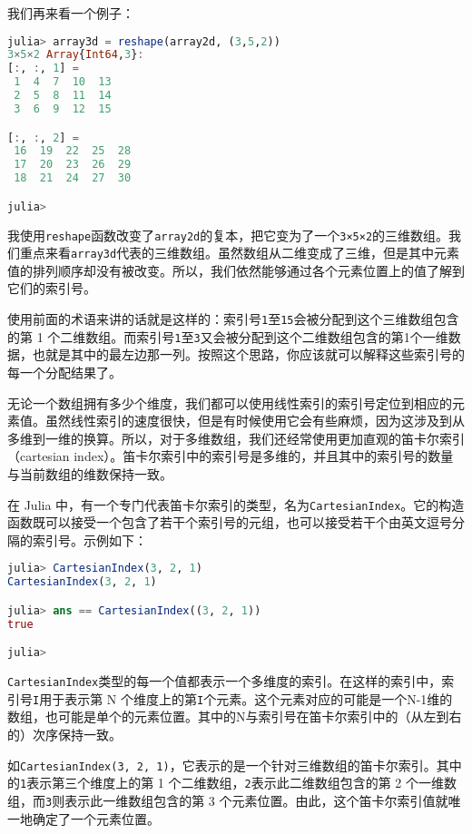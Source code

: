 我们再来看一个例子：

\begin{lstlisting}[language=julia]
julia> array3d = reshape(array2d, (3,5,2))
3×5×2 Array{Int64,3}:
[:, :, 1] =
 1  4  7  10  13
 2  5  8  11  14
 3  6  9  12  15

[:, :, 2] =
 16  19  22  25  28
 17  20  23  26  29
 18  21  24  27  30

julia> 
\end{lstlisting}

我使用\verb`reshape`函数改变了\verb`array2d`的复本，把它变为了一个\verb`3×5×2`的三维数组。我们重点来看\verb`array3d`代表的三维数组。虽然数组从二维变成了三维，但是其中元素值的排列顺序却没有被改变。所以，我们依然能够通过各个元素位置上的值了解到它们的索引号。

使用前面的术语来讲的话就是这样的：索引号\verb`1`至\verb`15`会被分配到这个三维数组包含的第 1 个二维数组。而索引号\verb`1`至\verb`3`又会被分配到这个二维数组包含的第1个一维数据，也就是其中的最左边那一列。按照这个思路，你应该就可以解释这些索引号的每一个分配结果了。

无论一个数组拥有多少个维度，我们都可以使用线性索引的索引号定位到相应的元素值。虽然线性索引的速度很快，但是有时候使用它会有些麻烦，因为这涉及到从多维到一维的换算。所以，对于多维数组，我们还经常使用更加直观的笛卡尔索引（cartesian index）。笛卡尔索引中的索引号是多维的，并且其中的索引号的数量与当前数组的维数保持一致。

在 Julia 中，有一个专门代表笛卡尔索引的类型，名为\verb`CartesianIndex`。它的构造函数既可以接受一个包含了若干个索引号的元组，也可以接受若干个由英文逗号分隔的索引号。示例如下：

\begin{lstlisting}[language=julia]
julia> CartesianIndex(3, 2, 1)
CartesianIndex(3, 2, 1)

julia> ans == CartesianIndex((3, 2, 1))
true

julia> 
\end{lstlisting}

\verb`CartesianIndex`类型的每一个值都表示一个多维度的索引。在这样的索引中，索引号\verb`I`用于表示第 N 个维度上的第\verb`I`个元素。这个元素对应的可能是一个N-1维的数组，也可能是单个的元素位置。其中的N与索引号在笛卡尔索引中的（从左到右的）次序保持一致。

如\verb`CartesianIndex(3, 2, 1)`，它表示的是一个针对三维数组的笛卡尔索引。其中的\verb`1`表示第三个维度上的第 1 个二维数组，\verb`2`表示此二维数组包含的第 2 个一维数组，而\verb`3`则表示此一维数组包含的第 3 个元素位置。由此，这个笛卡尔索引值就唯一地确定了一个元素位置。

